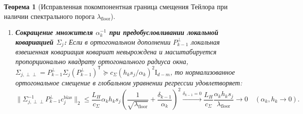 \documentclass[11pt,a4paper]{article}
\newcommand{\Id}{\mathrm{I}}
\newcommand{\T}{^{\mathsf{T}}}
\newtheorem{theorem}{Теорема}[section]
\theoremstyle{definition}
\theoremstyle{remark}
\begin{document}
\begin{theorem}[Исправленная покомпонентная граница смещения Тейлора при наличии спектрального порога $\lambda_{\mathrm{floor}}$]
\begin{enumerate}
\begin{align}
        \bigl\|(\Id_d - P_{k-1}\T P_{k-1}) c_j^{\mathrm{bias}}\bigr\|_2 &\le L_H h_k^3 s_j^3 \, \frac{1}{\alpha_k}\left(\frac{1}{\sqrt{\lambda_{\mathrm{floor}}}} + \frac{\delta_{k-1}}{\alpha_k}\right)^2 \xrightarrow{\delta_{k-1} = 0} \frac{L_H h_k^3 s_j^3}{\lambda_{\mathrm{floor}} \alpha_k}, \label{eq:ortho_bias_bound}
    \end{align}
    и для произвольного единичного направления $\phi_{j,s} \in \mathbb{S}^{d-1}$ направленное смещение $b_{j,s} = \langle \phi_{j,s}, c_j^{\mathrm{bias}}\rangle$ при $\delta_{k-1} = 0$ имеет точную по порядку верхнюю границу $|b_{j,s}| \le \frac{L_H h_k^3 s_j^3}{\lambda_{\mathrm{floor}}}\bigl(\frac{\|P_{k-1}\phi_{j,s}\|_2}{\sqrt{\lambda_{\mathrm{floor}}}} + \frac{\|P_{k-1}^\perp \phi_{j,s}\|_2}{\alpha_k}\bigr)$, достигаемую по порядку $\Theta(h_k^3 / \alpha_k)$ на Контрпримере \ref{cex:ortho_bias_alpha}.
    \item \textbf{Сокращение множителя $\alpha_k^{-1}$ при предобусловливании локальной ковариацией $\Sigma_j$:}
    Если в ортогональном дополнении $P_{k-1}^\perp$ локальная взвешенная ковариация ковариат невырождена и масштабируется пропорционально квадрату ортогонального радиуса окна, $\Sigma_{j,\perp\perp} = P_{k-1}^\perp \Sigma_j (P_{k-1}^\perp)\T \succeq c_\Sigma (h_k s_j / \alpha_k)^2 \Id_{d-m}$, то нормализованное ортогональное смещение в глобальном уравнении регрессии удовлетворяет:
    \begin{equation}\label{eq:preconditioned_ortho_bias}
        \bigl\|\Sigma_{j,\perp\perp}^{-1} P_{k-1}^\perp c_j^{\mathrm{bias}}\bigr\|_2 \le \frac{L_H}{c_\Sigma} \alpha_k h_k s_j \left(\frac{1}{\sqrt{\lambda_{\mathrm{floor}}}} + \frac{\delta_{k-1}}{\alpha_k}\right)^2 \xrightarrow{\delta_{k-1} = 0} \frac{L_H}{c_\Sigma} \frac{\alpha_k h_k s_j}{\lambda_{\mathrm{floor}}} \to 0 \quad (\alpha_k, h_k \to 0).
    \end{equation}
\end{enumerate}
\end{theorem}
\end{document}
